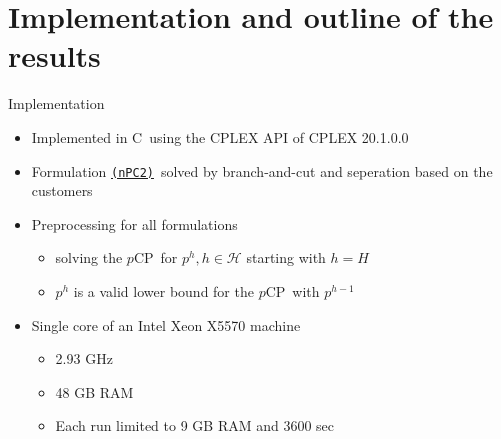 \documentclass[utf8,aspectratio=169,ngerman,english]{beamer}
\def\Cplusplus{C\raisebox{0.5ex}{\tiny\textbf{++}}}
\newcommand{\nPCY}{\hyperref[eq:nPCY]{\texttt{(nPC2)}}}
\newcommand{\pCP}{$p$CP}
\begin{document}
\section{Implementation and outline of the results}
\begin{frame}{Implementation}
    \begin{itemize}
        \item Implemented in \Cplusplus\ using the CPLEX API of CPLEX 20.1.0.0
        \item Formulation \nPCY\ solved by branch-and-cut and seperation based on the customers
        \item Preprocessing for all formulations
              \begin{itemize}
                  \item solving the \pCP\ for $p^h, h \in \mathcal H$ starting with $h = H$
                  \item $p^h$ is a valid lower bound for the \pCP\ with $p^{h-1}$
              \end{itemize}
        \item Single core of an Intel Xeon X5570 machine
              \begin{itemize}
                  \item 2.93 GHz
                  \item 48 GB RAM
                  \item Each run limited to 9 GB RAM and 3600 sec
              \end{itemize}
    \end{itemize}
\end{frame}
\end{document}
